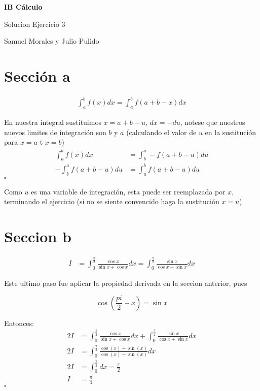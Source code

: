 \documentclass[spanish,12pt]{article}
\begin{document}
	\begin{titlepage}
	\begin{center}
	\hspace{0pt}
	\vfill
	{\Large\textbf{{IB Cálculo}}}
	
	\medskip
	Solucion Ejercicio 3
	
	\medskip
    Samuel Morales y Julio Pulido
	
	\thispagestyle{empty}
	\vfill
	\end{center}
	\end{titlepage}
\newpage
\tableofcontents
\newpage
\section{Sección a}

\begin{align*}
    \int_a^b f(x)dx= \int_a^b f(a+b-x) dx
\end{align*}

En nuestra integral sustituimos $x=a+b-u$, $dx=-du$, notese que nuestros nuevos limites de integración son $b$ y $a$ (calculando el valor de $u$ en la sustitución para $x=a$ t $x=b$)
\begin{align*}
    \int_a^b f(x)dx&= \int_b^a -f(a+b-u) du\\
    -\int_b^a f(a+b-u) du&=\int_a^b f(a+b-u) du
\end{align*}
\hfill $\square$

Como $u$ es una variable de integración, esta puede ser reemplazada por $x$, terminando el ejercicio (si no se siente convencido haga la sustitución $x=u$)

\section{Seccion b}
\begin{align*}
    I&=\int_0^{\frac{\pi}{2}}\frac{\cos{x}}{\sin{x+\cos{x}}}dx=\int_0^{\frac{\pi}{2}}\frac{\sin{x}}{\cos{x}+\sin{x}}dx
\end{align*}

Este ultimo paso fue aplicar la propiedad derivada en la seccion anterior, pues 

$$\cos{\left(\frac{pi}{2}-x\right)}=\sin{x}$$

Entonces:
\begin{align*}
    2I&=\int_0^{\frac{\pi}{2}}\frac{\cos{x}}{\sin{x+\cos{x}}}dx+\int_0^{\frac{\pi}{2}}\frac{\sin{x}}{\cos{x}+\sin{x}}dx\\
    2I&=\int_0^{\frac{\pi}{2}}\frac{\cos(x)+\sin(x)}{\cos(x)+\sin(x)}dx\\
    2I&=\int_0^{\frac{\pi}{2}} dx=\frac{\pi}{2}\\
    I&=\frac{\pi}{4}
\end{align*}
\hfill $\square$
\end{document}
